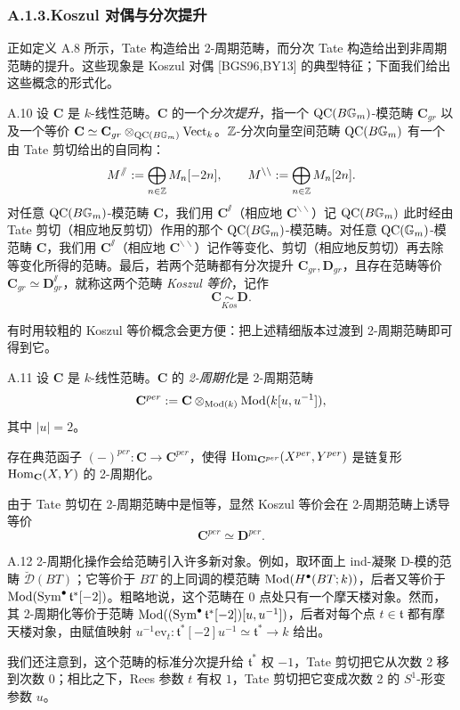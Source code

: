 \subsubsection*{A.1.3.\quad Koszul 对偶与分次提升}

正如定义 A.8 所示，Tate 构造给出 2-周期范畴，而分次 Tate 构造给出到非周期范畴的提升。这些现象是 Koszul 对偶 [BGS96,BY13] 的典型特征；下面我们给出这些概念的形式化。

\begin{defn}{A.10}\label{defn:a5-04-4}
设 $\mathbf C$ 是 $k$-线性范畴。$\mathbf C$ 的一个\emph{分次提升}，指一个 $\mathrm{QC}(B\mathbb{G}_m)$-模范畴 $\mathbf C_{gr}$ 以及一个等价 $\mathbf C\simeq\mathbf C_{gr}\otimes_{\mathrm{QC}(B\mathbb{G}_m)}\mathrm{Vect}_k$。$\mathbb{Z}$-分次向量空间范畴 $\mathrm{QC}(B\mathbb{G}_m)$ 有一个由 Tate 剪切给出的自同构：
\[
M^{\sslash}:=\bigoplus_{n\in\mathbb{Z}}M_n[-2n],\qquad
M^{\backslash\backslash}:=\bigoplus_{n\in\mathbb{Z}}M_n[2n].
\]
对任意 $\mathrm{QC}(B\mathbb{G}_m)$-模范畴 $\mathbf C$，我们用 $\mathbf C^{\sslash}$（相应地 $\mathbf C^{\backslash\backslash}$）记 $\mathrm{QC}(B\mathbb{G}_m)$ 此时经由 Tate 剪切（相应地反剪切）作用的那个 $\mathrm{QC}(B\mathbb{G}_m)$-模范畴。对任意 $\mathrm{QC}(\mathbb{G}_m)$-模范畴 $\mathbf C$，我们用 $\mathbf C^{\sslash}$（相应地 $\mathbf C^{\backslash\backslash}$）记作等变化、剪切（相应地反剪切）再去除等变化所得的范畴。最后，若两个范畴都有分次提升 $\mathbf C_{gr},\mathbf D_{gr}$，且存在范畴等价 $\mathbf C_{gr}\simeq\mathbf D_{gr}^{\sslash}$，就称这两个范畴 \emph{Koszul 等价}，记作
\[
\mathbf C\underset{Kos}{\sim}\mathbf D.
\]
\end{defn}


有时用较粗的 Koszul 等价概念会更方便：把上述精细版本过渡到 2-周期范畴即可得到它。

\begin{defn}{A.11}\label{defn:a5-04-5}
设 $\mathbf C$ 是 $k$-线性范畴。$\mathbf C$ 的 \emph{2-周期化}是 2-周期范畴
\[
\mathbf C^{per}:=\mathbf C\otimes_{\operatorname{Mod}(k)}\operatorname{Mod}(k[u,u^{-1}]),
\]
其中 $|u|=2$。
\end{defn}

存在典范函子 $(-)^{per}:\mathbf C\to\mathbf C^{per}$，使得 $\operatorname{Hom}_{\mathbf C^{per}}(X^{per},Y^{per})$ 是链复形 $\operatorname{Hom}_{\mathbf C}(X,Y)$ 的 2-周期化。

由于 Tate 剪切在 2-周期范畴中是恒等，显然 Koszul 等价会在 2-周期范畴上诱导等价
\[
\mathbf C^{per}\simeq\mathbf D^{per}.
\]

\begin{exam}{A.12}\label{exam:a5-04-6}
2-周期化操作会给范畴引入许多新对象。例如，取环面上 ind-凝聚 D-模的范畴 $\breve{\mathcal D}(BT)$；它等价于 $BT$ 的上同调的模范畴 $\operatorname{Mod}(H^\bullet(BT;k))$，后者又等价于 $\operatorname{Mod}(\operatorname{Sym}^\bullet\mathfrak t^*[-2])$。粗略地说，这个范畴在 0 点处只有一个摩天楼对象。然而，其 2-周期化等价于范畴 $\operatorname{Mod}((\operatorname{Sym}^\bullet\mathfrak t^*[-2])[u,u^{-1}])$，后者对每个点 $t\in\mathfrak t$ 都有摩天楼对象，由赋值映射 $u^{-1}\mathrm{ev}_t:\mathfrak t^*[-2]u^{-1}\simeq\mathfrak t^*\to k$ 给出。

我们还注意到，这个范畴的标准分次提升给 $\mathfrak t^*$ 权 $-1$，Tate 剪切把它从次数 2 移到次数 0；相比之下，Rees 参数 $t$ 有权 $1$，Tate 剪切把它变成次数 2 的 $S^1$-形变参数 $u$。
\end{exam}

